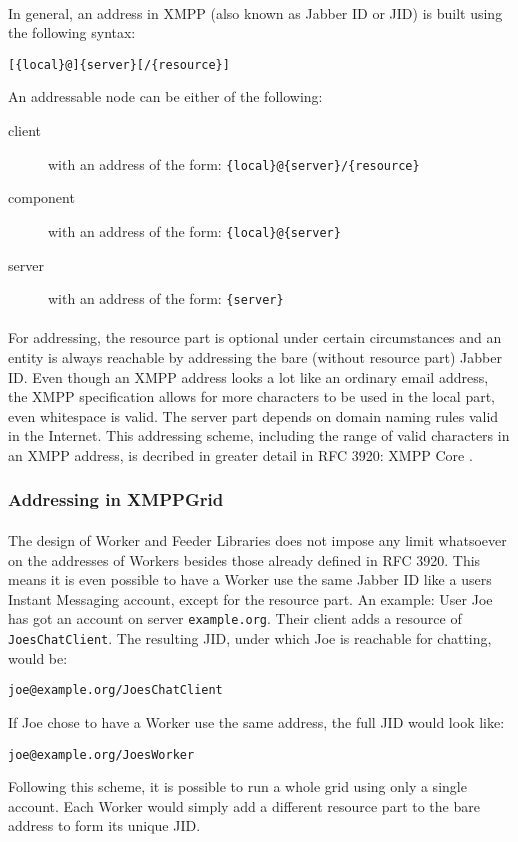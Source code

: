 \paragraph{}
In general, an address in XMPP (also known as Jabber ID or JID) is built using the following syntax:
\begin{center}
\texttt{[\{local\}@]\{server\}[/\{resource\}]}
\end{center}
An addressable node can be either of the following:
\begin{description}
\item[client] with an address of the form: \texttt{\{local\}@\{server\}/\{resource\}}
\item[component] with an address of the form: \texttt{\{local\}@\{server\}} 
\item[server] with  an address of the form: \texttt{\{server\}}
\end{description}
\paragraph{}
For addressing, the resource part is optional under certain circumstances and an entity is always reachable by addressing the bare (without resource part) Jabber ID. Even though an XMPP address looks a lot like an ordinary email address, the XMPP specification allows for more characters to be used in the local part, even whitespace is valid. The server part depends on domain naming rules valid in the Internet. This addressing scheme, including the range of valid characters in an XMPP address, is decribed in greater detail in RFC 3920: XMPP Core \cite{xmpp-core}.

\subsubsection{Addressing in XMPPGrid}
\label{sec:addressing}
\paragraph{}
The design of Worker and Feeder Libraries does not impose any limit whatsoever on the addresses of Workers besides those already defined in RFC 3920. This means it is even possible to have a Worker use the same Jabber ID like a users Instant Messaging account, except for the resource part. An example: User Joe has got an account on server \texttt{example.org}. Their client adds a resource of \texttt{JoesChatClient}. The resulting JID, under which Joe is reachable for chatting, would be:
\begin{center}
\texttt{joe@example.org/JoesChatClient}
\end{center}
If Joe chose to have a Worker use the same address, the full JID would look like:
\begin{center}
\texttt{joe@example.org/JoesWorker}
\end{center}
Following this scheme, it is possible to run a whole grid using only a single account. Each Worker would simply add a different resource part to the bare address to form its unique JID.
